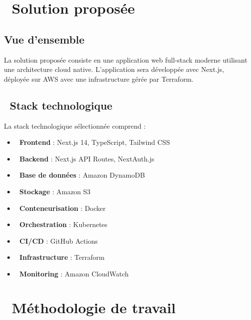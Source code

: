 \section{\faRocket\ Solution proposée}

\subsection{Vue d'ensemble}

\begin{infobox}
La solution proposée consiste en une application web full-stack moderne utilisant une architecture cloud native. L'application sera développée avec Next.js, déployée sur AWS avec une infrastructure gérée par Terraform.
\end{infobox}

\subsection{\faLayerGroup\ Stack technologique}

La stack technologique sélectionnée comprend :

\begin{itemize}
    \item \textbf{\color{primaryblue}\faCode\ Frontend} : Next.js 14, TypeScript, Tailwind CSS
    \item \textbf{\color{primaryblue}\faServer\ Backend} : Next.js API Routes, NextAuth.js
    \item \textbf{\color{primaryblue}\faDatabase\ Base de données} : Amazon DynamoDB
    \item \textbf{\color{primaryblue}\faCloud\ Stockage} : Amazon S3
    \item \textbf{\color{primaryblue}\faDocker\ Conteneurisation} : Docker
    \item \textbf{\color{primaryblue}\faNetworkWired\ Orchestration} : Kubernetes
    \item \textbf{\color{primaryblue}\faCodeBranch\ CI/CD} : GitHub Actions
    \item \textbf{\color{primaryblue}\faTools\ Infrastructure} : Terraform
    \item \textbf{\color{primaryblue}\faChartLine\ Monitoring} : Amazon CloudWatch
\end{itemize}

\section{\faProjectDiagram\ Méthodologie de travail}

